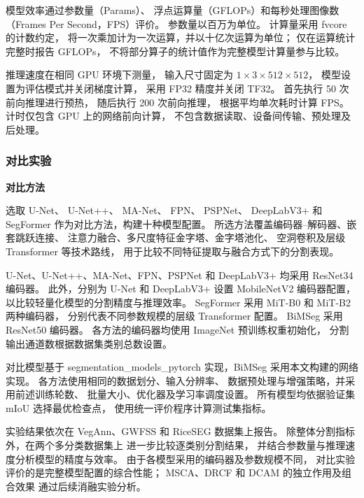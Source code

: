 模型效率通过参数量（Params）、
浮点运算量（GFLOPs）和每秒处理图像数
（Frames Per Second，FPS）评价。
参数量以百万为单位。
计算量采用 fvcore 的计数约定，
将一次乘加计为一次运算，并以十亿次运算为单位；
仅在运算统计完整时报告 GFLOPs，
不将部分算子的统计值作为完整模型计算量参与比较。

推理速度在相同 GPU 环境下测量，
输入尺寸固定为 \(1\times3\times512\times512\)，
模型设置为评估模式并关闭梯度计算，
采用 FP32 精度并关闭 TF32。
首先执行 50 次前向推理进行预热，
随后执行 200 次前向推理，
根据平均单次耗时计算 FPS。
计时仅包含 GPU 上的网络前向计算，
不包含数据读取、设备间传输、预处理及后处理。

\subsubsection{对比实验}
\label{sec:exp-comparison}

\medskip\noindent\textbf{对比方法}\par
\label{sec:exp-baselines}

选取 U-Net、
U-Net++、
MA-Net、
FPN、
PSPNet、
DeepLabV3+
和 SegFormer
作为对比方法，构建十种模型配置。
所选方法覆盖编码器--解码器、嵌套跳跃连接、
注意力融合、多尺度特征金字塔、金字塔池化、
空洞卷积及层级 Transformer 等技术路线，
用于比较不同特征提取与融合方式下的分割表现。

U-Net、U-Net++、MA-Net、FPN、PSPNet
和 DeepLabV3+ 均采用 ResNet34 编码器。
此外，分别为 U-Net 和 DeepLabV3+
设置 MobileNetV2 编码器配置，
以比较轻量化模型的分割精度与推理效率。
SegFormer 采用 MiT-B0 和 MiT-B2 两种编码器，
分别代表不同参数规模的层级 Transformer 配置。
BiMSeg 采用 ResNet50 编码器。
各方法的编码器均使用 ImageNet 预训练权重初始化，
分割输出通道数根据数据集类别总数设置。

对比模型基于
segmentation\_models\_pytorch
实现，BiMSeg 采用本文构建的网络实现。
各方法使用相同的数据划分、输入分辨率、
数据预处理与增强策略，并采用前述训练轮数、
批量大小、优化器及学习率调度设置。
所有模型均依据验证集 mIoU 选择最优检查点，
使用统一评价程序计算测试集指标。

实验结果依次在 VegAnn、GWFSS 和 RiceSEG
数据集上报告。
除整体分割指标外，在两个多分类数据集上
进一步比较逐类别分割结果，
并结合参数量与推理速度分析模型的精度与效率。
由于各模型采用的编码器及参数规模不同，
对比实验评价的是完整模型配置的综合性能；
MSCA、DRCF 和 DCAM 的独立作用及组合效果
通过后续消融实验分析。



